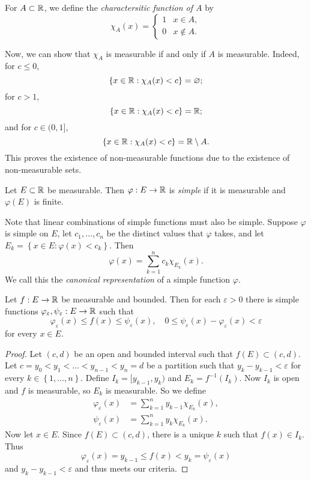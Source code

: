 \begin{definition}
	For $A \subset \mathbb{R}$, we define the
	\emph{charactersitic function of $A$} by
	\[
		\chi_A(x) =
		\begin{cases}
			1 & x \in A, \\
			0 & x \not\in A.
		\end{cases}
	\]
\end{definition}

Now, we can show that $\chi_A$ is measurable if and only if $A$ is measurable.
Indeed, for $c \leq 0$,
\[
	\left\{
		x \in \mathbb{R}: \chi_A(x) < c
	\right\}
	= \varnothing;
\]
for $c > 1$,
\[
	\left\{
		x \in \mathbb{R}: \chi_A(x) < c
	\right\}
	= \mathbb{R};
\]
and for $c \in (0,1]$,
\[
	\left\{
		x \in \mathbb{R}: \chi_A(x) < c
	\right\}
	= \mathbb{R} \setminus A.
\]
This proves the existence of non-measurable functions due to the existence 
of non-measurable sets.

\begin{definition}
	Let $E \subset \mathbb{R}$ be measurable.
	Then $\varphi: E \to \mathbb{R}$ is \emph{simple} if it is measurable
	and $\varphi(E)$ is finite.
\end{definition}

Note that linear combinations of simple functions must also be simple.
Suppose $\varphi$ is simple on $E$, let $c_1, \ldots, c_n$
be the distinct values that $\varphi$ takes, and let
$
	E_k =
	\left\{
		x \in E: \varphi(x) < c_k
	\right\}.
$
Then
\[
	\varphi(x) = \sum_{k=1}^n c_k \chi_{E_k}(x).
\]
We call this the \emph{canonical representation} of a simple function $\varphi$.

\begin{lemma}
	Let $f: E \to \mathbb{R}$ be measurable and bounded.
	Then for each $\varepsilon > 0$ there is simple functions
	$\varphi_{\varepsilon}, \psi_{\varepsilon}: E \to \mathbb{R}$
	such that
	\[
		\varphi_\varepsilon(x) \leq f(x) \leq \psi_\varepsilon(x),
		\quad
		0 \leq \psi_\varepsilon(x) - \varphi_\varepsilon(x) < \varepsilon
	\]
	for every $x \in E$.
\end{lemma}

\begin{proof}
	Let $(c, d)$ be an open and bounded interval such that
	$f(E) \subset (c,d)$.
	Let $c = y_0 < y_1 < \ldots < y_{n-1} < y_n = d$
	be a partition such that $y_k - y_{k-1} < \varepsilon$
	for every $k \in \left\{
		1, \ldots, n
	\right\}$.
	Define
	$I_k = [y_{k-1}, y_k)$ and $E_k = f^{-1}(I_k)$.
	Now $I_k$ is open and $f$ is measurable, so
	$E_k$ is measurable.
	So we define
	\begin{align*}
		\varphi_\varepsilon(x)
		&= \sum_{k=1}^n y_{k-1} \chi_{E_k}(x), \\
		\psi_\varepsilon(x)
		&= \sum_{k=1}^n y_k \chi_{E_k}(x).
	\end{align*}
	Now let $x \in E$.
	Since $f(E) \subset (c,d)$,
	there is a unique $k$ such that $f(x) \in I_k$.
	Thus
	\[
		\varphi_\varepsilon(x) = y_{k-1} \leq f(x) < y_k = \psi_\varepsilon(x)
	\]
	and $y_k - y_{k-1} < \varepsilon$ and thus meets our criteria.
\end{proof}

